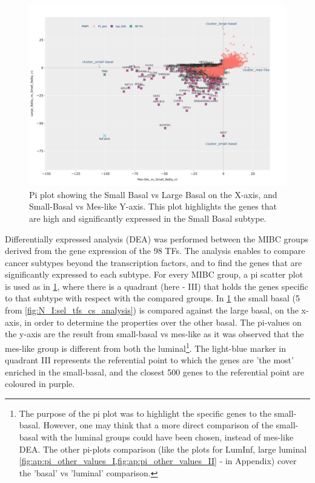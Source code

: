 \begin{figure}[!htb]   
\centering
\includegraphics[width=1.0\textwidth,height=1.0\textheight,keepaspectratio]{Sections/Network_I/Resources/selective_pruning/pi_gsea/pi_smallBasal.png}
  \caption{Pi plot showing the Small Basal vs Large Basal on the X-axis, and Small-Basal vs Mes-like Y-axis. This plot highlights the genes that are high and significantly expressed in the Small Basal subtype. }
\label{fig:N_I:pi_smallBasal_comp}
\end{figure}

Differentially expressed analysis (DEA) was performed between the MIBC groups derived from the gene expression of the 98 TFs. The analysis enables to compare cancer subtypes beyond the transcription factors, and to find the genes that are significantly expressed to each subtype. For every MIBC group, a pi scatter plot is used as in \cref{fig:N_I:pi_smallBasal_comp}, where there is a quadrant (here - III) that holds the genes specific to that subtype with respect with the compared groups. In \cref{fig:N_I:pi_smallBasal_comp} the small basal (5 from \cref{fig:N_I:sel_tfs_cs_analysis}) is compared against the large basal, on the x-axis, in order to determine the properties over the other basal. The pi-values on the y-axis are the result from small-basal vs mes-like as it was observed that the mes-like group is different from both the luminal\footnote{The purpose of the pi plot was to highlight the specific genes to the small-basal. However, one may think that a more direct comparison of the small-basal with the luminal groups could have been chosen, instead of mes-like DEA. The other pi-plots comparison (like the plots for LumInf,  large luminal \cref{fig:ap:pi_other_values_I,fig:ap:pi_other_values_II} - in Appendix) cover the 'basal' vs 'luminal' comparison. }. The light-blue marker in quadrant III represents the referential point to which the genes are 'the most' enriched in the small-basal, and the closest 500 genes to the referential point are coloured in purple. 


